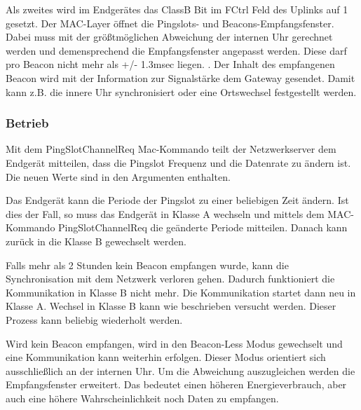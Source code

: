 \documentclass[a4paper, 12pt]{article}
\begin{document}
                Als zweites wird im Endgerätes das ClassB Bit im FCtrl Feld des Uplinks auf 1 gesetzt. 
                Der MAC-Layer öffnet die Pingslots- und Beacons-Empfangsfenster. Dabei muss mit 
                der größtmöglichen Abweichung der internen Uhr gerechnet werden und demensprechend die 
                Empfangsfenster angepasst werden. Diese darf pro Beacon nicht mehr als +/- 1.3msec liegen. 
                \cite[S.73]{LoRaSpec}. Der Inhalt des empfangenen Beacon wird mit der Information zur 
                Signalstärke dem Gateway gesendet. Damit kann z.B. die innere Uhr synchronisiert 
                oder eine Ortswechsel festgestellt werden.
            \subsubsection{Betrieb}
                Mit dem PingSlotChannelReq Mac-Kommando teilt der Netzwerkserver dem Endgerät mitteilen, dass 
                die Pingslot Frequenz und die Datenrate zu ändern ist. Die neuen Werte sind in den 
                Argumenten enthalten.
                        
                Das Endgerät kann die Periode der Pingslot zu einer beliebigen Zeit ändern. Ist dies der Fall, so 
                muss das Endgerät in Klasse A wechseln und mittels dem MAC-Kommando PingSlotChannelReq die geänderte 
                Periode mitteilen. Danach kann zurück in die Klasse B gewechselt werden.

                Falls mehr als 2 Stunden kein Beacon empfangen wurde, kann die Synchronisation mit dem Netzwerk 
                verloren gehen. Dadurch funktioniert die Kommunikation in Klasse B nicht mehr. Die Kommunikation startet 
                dann neu in Klasse A. Wechsel in Klasse B kann wie beschrieben versucht werden. 
                Dieser Prozess kann beliebig wiederholt werden.

                Wird kein Beacon empfangen, wird in den Beacon-Less Modus gewechselt und eine Kommunikation kann 
                weiterhin erfolgen. Dieser Modus orientiert sich ausschließlich an der internen Uhr.
                Um die Abweichung auszugleichen werden die Empfangsfenster erweitert. Das bedeutet einen höheren 
                Energieverbrauch, aber auch eine höhere Wahrscheinlichkeit noch 
                Daten zu empfangen.
\end{document}
